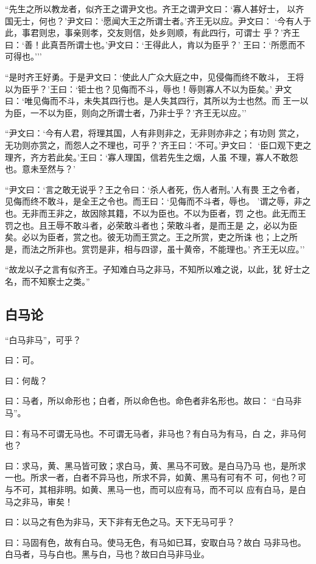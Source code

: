 \documentclass[]{article}
\begin{document}
``先生之所以教龙者，似齐王之谓尹文也。齐王之谓尹文曰：`寡人甚好士，
以齐国无士，何也？'尹文曰：`愿闻大王之所谓士者。'齐王无以应。尹文曰：
`今有人于此，事君则忠，事亲则孝，交友则信，处乡则顺，有此四行，可谓士
乎？'齐王曰：`善！此真吾所谓士也。'尹文曰：`王得此人，肯以为臣乎？'
王曰：`所愿而不可得也。'''

``是时齐王好勇。于是尹文曰：`使此人广众大庭之中，见侵侮而终不敢斗，
王将以为臣乎？'王曰：`钜士也？见侮而不斗，辱也！辱则寡人不以为臣矣。'
尹文曰：`唯见侮而不斗，未失其四行也。是人失其四行，其所以为士也然。而
王一以为臣，一不以为臣，则向之所谓士者，乃非士乎？'齐王无以应。''

``尹文曰：`今有人君，将理其国，人有非则非之，无非则亦非之；有功则
赏之，无功则亦赏之，而怨人之不理也，可乎？'齐王曰：`不可。'尹文曰：
`臣口观下吏之理齐，齐方若此矣。'王曰：`寡人理国，信若先生之烟，人虽
不理，寡人不敢怨也。意未至然与？'

``尹文曰：`言之敢无说乎？王之令曰：`杀人者死，伤人者刑。'人有畏
王之令者，见侮而终不敢斗，是全王之令也。而王曰：`见侮而不斗者，辱也。
'谓之辱，非之也。无非而王非之，故因除其籍，不以为臣也。不以为臣者，罚
之也。此无而王罚之也。且王辱不敢斗者，必荣敢斗者也；荣敢斗者，是而王是
之，必以为臣矣。必以为臣者，赏之也。彼无功而王赏之。王之所赏，吏之所诛
也；上之所是，而法之所非也。赏罚是非，相与四谬，虽十黄帝，不能理也。'
齐王无以应。''

``故龙以子之言有似齐王。子知难白马之非马，不知所以难之说，以此，犹
好士之名，而不知察士之类。''

\hypertarget{header-n13}{%
\subsection{白马论}\label{header-n13}}

``白马非马''，可乎？

曰：可。

曰：何哉？

曰：马者，所以命形也；白者，所以命色也。命色者非名形也。故曰：
``白马非马''。

曰：有马不可谓无马也。不可谓无马者，非马也？有白马为有马，白
之，非马何也？

曰：求马，黄、黑马皆可致；求白马，黄、黑马不可致。是白马乃马
也，是所求一也。所求一者，白者不异马也，所求不异，如黄、黑马有可有不
可，何也？可与不可，其相非明。如黄、黑马一也，而可以应有马，而不可以
应有白马，是白马之非马，审矣！

曰：以马之有色为非马，天下非有无色之马。天下无马可乎？

曰：马固有色，故有白马。使马无色，有马如已耳，安取白马？故白
马非马也。白马者，马与白也。黑与白，马也？故曰白马非马业。
\end{document}
